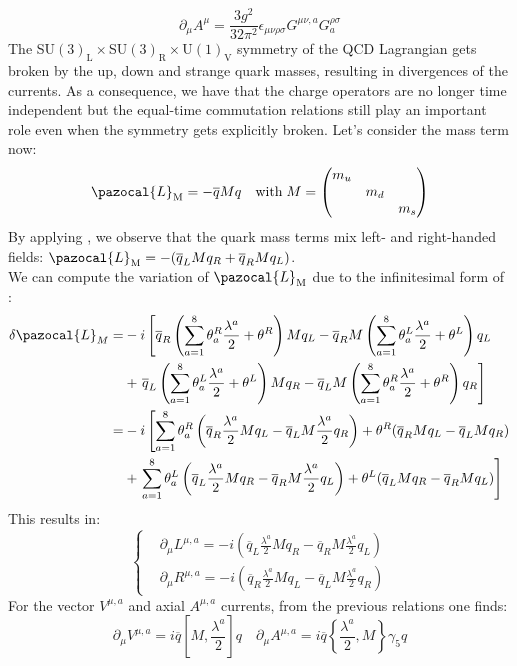 \documentclass[../main.tex]{subfiles}
\begin{document}
\[
\partial_\mu A^\mu=\frac{3g^2}{32\pi^2}\epsilon_{\mu\nu\rho\sigma}G^{\mu\nu,a}G^{\rho\sigma}_a
\]
The SU$(3)_{\text{L}}\times$SU$(3)_{\text{R}}\times$U$(1)_{\text{V}}$ symmetry of the QCD Lagrangian gets broken by the up, down and strange quark masses, resulting in divergences of the currents. As a consequence, we have that the charge operators are no longer time independent but the equal-time commutation relations still play an important role even when the symmetry gets explicitly broken. Let's consider the mass term now:
\[
\pazocal{L}_{\text{M}}=-\overline{q}Mq \quad \text{with}\;M=\mqty(\dmat{m_u,m_d,m_s})
\]
By applying , we observe that the quark mass terms mix left- and right-handed fields: $\pazocal{L}_{\text{M}}=-(\overline{q}_LMq_R+\overline{q}_RMq_L)$.\\
We can compute the variation of $\pazocal{L}_{\text{M}}$ due to the infinitesimal form of :
\begin{align*}
\delta\pazocal{L}_M=&-i\left[\overline{q}_R\left(\sum_{a=1}^8\theta_a^R\frac{\lambda^a}{2}+\theta^R\right)Mq_L-\overline{q}_RM\left(\sum_{a=1}^8\theta_a^L\frac{\lambda^a}{2}+\theta^L\right)q_L\right.\\
&+\left.\overline{q}_L\left(\sum_{a=1}^8\theta_a^L\frac{\lambda^a}{2}+\theta^L\right)Mq_R-\overline{q}_LM\left(\sum_{a=1}^8\theta_a^R\frac{\lambda^a}{2}+\theta^R\right)q_R\right]\\
=&-i\left[\sum_{a=1}^8\theta_a^R\left(\overline{q}_R\frac{\lambda^a}{2}Mq_L-\overline{q}_LM\frac{\lambda^a}{2}q_R\right)+\theta^R(\overline{q}_RMq_L-\overline{q}_LMq_R)\right.\\
&+\left.\sum_{a=1}^8\theta_a^L\left(\overline{q}_L\frac{\lambda^a}{2}Mq_R-\overline{q}_RM\frac{\lambda^a}{2}q_L\right)+\theta^L(\overline{q}_LMq_R-\overline{q}_RMq_L)\right]
\end{align*}
This results in:
\[
\left\{
\begin{aligned}
&\partial_\mu L^{\mu,a}=-i\left(\overline{q}_L\frac{\lambda^a}{2}Mq_R-\overline{q}_RM\frac{\lambda^a}{2}q_L\right)\\
&\partial_\mu R^{\mu,a}=-i\left(\overline{q}_R\frac{\lambda^a}{2}Mq_L-\overline{q}_LM\frac{\lambda^a}{2}q_R\right)
\end{aligned}
\right.
\]
For the vector $V^{\mu,a}$ and axial $A^{\mu,a}$ currents, from the previous relations one finds:
\[
\partial_\mu V^{\mu,a}=i\overline{q}\left[M,\frac{\lambda^a}{2}\right]q \quad \partial_\mu A^{\mu,a}=i\overline{q}\left\{\frac{\lambda^a}{2},M\right\}\gamma_5q
\]
\end{document}
